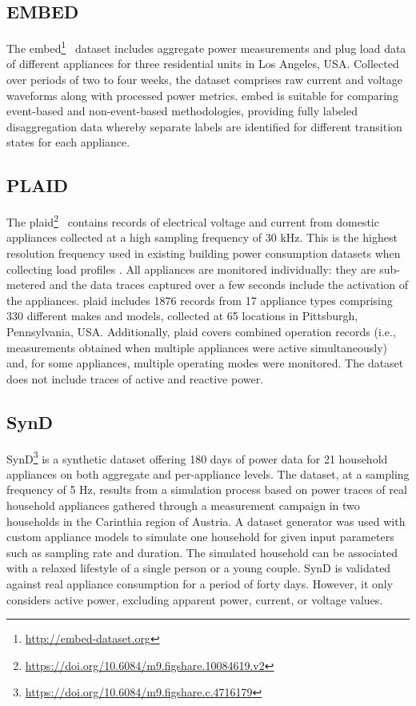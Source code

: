 \subsection{EMBED}

The \acrlong{embed}\footnote{\url{http://embed-dataset.org}}~\parencite{jazizadehEMBEDDatasetEnergy2018} dataset includes aggregate power measurements and plug load data of different appliances for three residential units in Los Angeles, USA. Collected over periods of two to four weeks, the dataset comprises raw current and voltage waveforms along with processed power metrics. \acrshort{embed} is suitable for comparing event-based and non-event-based methodologies, providing fully labeled disaggregation data whereby separate labels are identified for different transition states for each appliance.

\subsection{PLAID}

The \acrlong{plaid}\footnote{\url{https://doi.org/10.6084/m9.figshare.10084619.v2}}~\parencite{medicoVoltageCurrentMeasurement2020} contains records of electrical voltage and current from domestic appliances collected at a high sampling frequency of 30 kHz. This is the highest resolution frequency used in existing building power consumption datasets when collecting load profiles \parencite{himeurBuildingPowerConsumption2020}. All appliances are monitored individually: they are sub-metered and the data traces captured over a few seconds include the activation of the appliances. \acrshort{plaid} includes 1876 records from 17 appliance types comprising 330 different makes and models, collected at 65 locations in Pittsburgh, Pennsylvania, USA. Additionally, \acrshort{plaid} covers combined operation records (i.e., measurements obtained when multiple appliances were active simultaneously) and, for some appliances, multiple operating modes were monitored. The dataset does not include traces of active and reactive power.

\subsection{SynD}

SynD\footnote{\url{https://doi.org/10.6084/m9.figshare.c.4716179}} \parencite{klemenjakSyntheticEnergyDataset2020} is a synthetic dataset offering 180 days of  power data for 21 household appliances on both aggregate and per-appliance levels. The dataset, at a sampling frequency of 5 Hz, results from a simulation process based on power traces of real household appliances gathered through a measurement campaign in two households in the Carinthia region of Austria. A dataset generator was used with custom appliance models to simulate one household for given input parameters such as sampling rate and duration. The simulated household can be associated with a relaxed lifestyle of a single person or a young couple. SynD is validated against real appliance consumption for a period of forty days. However, it only considers active power, excluding apparent power, current, or voltage values.

